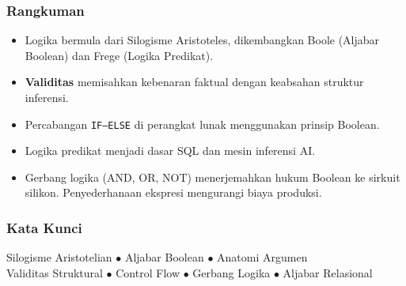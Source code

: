 \documentclass[handout]{beamer}
\theoremstyle{definition}
\theoremstyle{example}
\begin{document}
\begin{frame}
\frametitle{Rangkuman}
\begin{itemize}
  \item Logika bermula dari Silogisme Aristoteles, dikembangkan Boole (Aljabar Boolean) dan Frege (Logika Predikat).
  \item \textbf{Validitas} memisahkan kebenaran faktual dengan keabsahan struktur inferensi.
  \item Percabangan \texttt{IF--ELSE} di perangkat lunak menggunakan prinsip Boolean.
  \item Logika predikat menjadi dasar SQL dan mesin inferensi AI.
  \item Gerbang logika (AND, OR, NOT) menerjemahkan hukum Boolean ke sirkuit silikon. Penyederhanaan ekspresi mengurangi biaya produksi.
\end{itemize}
\end{frame}

\begin{frame}
\frametitle{Kata Kunci}
\begin{center}
Silogisme Aristotelian $\bullet$ Aljabar Boolean $\bullet$ Anatomi Argumen\\
Validitas Struktural $\bullet$ Control Flow $\bullet$ Gerbang Logika $\bullet$ Aljabar Relasional
\end{center}
\end{frame}
\end{document}
